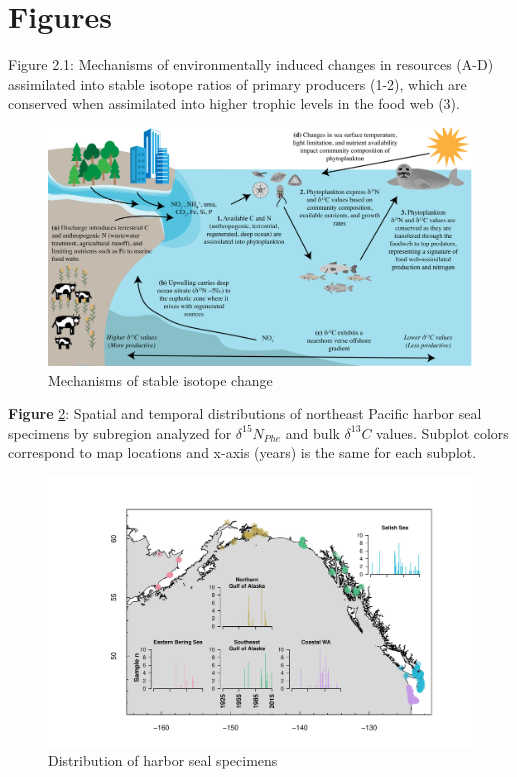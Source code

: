 \documentclass [11pt, proquest] {uwthesis}[2015/03/03]
\begin{document}
\section{Figures}\label{figures-1}
\begin{landscape}

Figure 2.1: Mechanisms of environmentally induced changes in resources (A-D) assimilated into stable isotope ratios of primary producers (1-2), which are conserved when assimilated into higher trophic levels in the food web (3).\newline 
\begin{figure}[h]
\centering
  \includegraphics[width=1.1\textwidth]{figure/Ch2/Figure1.pdf}
  \caption{Mechanisms of stable isotope change}
  \label{fig:theo}
\end{figure}
\end{landscape}
\clearpage

\textbf{Figure} \ref{fig:map}: Spatial and temporal distributions of
northeast Pacific harbor seal specimens by subregion analyzed for
\(\delta^{15}N_{Phe}\) and bulk \(\delta^{13}C\) values. Subplot colors
correspond to map locations and x-axis (years) is the same for each
subplot.\newline 
\begin{figure}[h]
\centering
  \includegraphics[width=1.2\textwidth]{figure/Ch2/Fig2_Map.pdf}
  \caption{Distribution of harbor seal specimens}
  \label{fig:map}
\end{figure}
\clearpage
\end{document}
